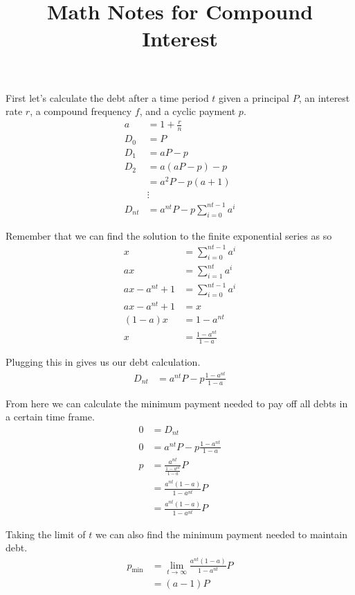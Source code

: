 \documentclass[12pt]{article}
\title{Math Notes for Compound Interest}
\author{}
\date{}
\begin{document}
\maketitle

First let's calculate the debt after a time period $t$ given a principal $P$, an
interest rate $r$, a compound frequency $f$, and a cyclic payment $p$.
\begin{align*}
    a &= 1 + \frac{r}{n}\\
    D_0 &= P\\
    D_1 &= aP - p\\
    D_2 &= a(aP - p) - p\\
        &= a^2 P - p (a + 1)\\
        &\vdots\\
    D_{nt} &= a^{nt} P - p \sum_{i = 0}^{nt - 1} a^i
\end{align*}

Remember that we can find the solution to the finite exponential series as so
\begin{align*}
    x &= \sum_{i = 0}^{nt - 1} a^i\\
    ax &= \sum_{i = 1}^{nt} a^i\\
    ax - a^{nt} + 1 &= \sum_{i = 0}^{nt - 1} a^i\\
    ax - a^{nt} + 1 &= x\\
    (1 - a) x &= 1 - a^{nt}\\
    x &= \frac{1 - a^{nt}}{1 - a}
\end{align*}

Plugging this in gives us our debt calculation.
\begin{align*}
    D_{nt} &= a^{nt} P - p \frac{1 - a^{nt}}{1 - a}
\end{align*}

From here we can calculate the minimum payment needed to pay off all debts in
a certain time frame.
\begin{align*}
    0 &= D_{nt}\\
    0 &= a^{nt} P - p \frac{1 - a^{nt}}{1 - a}\\
    p &= \frac{a^{nt}}{\frac{1 - a^{nt}}{1 - a}} P\\
      &= \frac{a^{nt} (1 - a)}{1 - a^{nt}} P\\
      &= \frac{a^{nt} (1 - a)}{1 - a^{nt}} P
\end{align*}

Taking the limit of $t$ we can also find the minimum payment needed to maintain
debt.
\begin{align*}
    p_\text{min} &= \lim_{t \to \infty} \frac{a^{nt} (1 - a)}{1 - a^{nt}} P\\
                 &= (a - 1) P
\end{align*}
\end{document}
